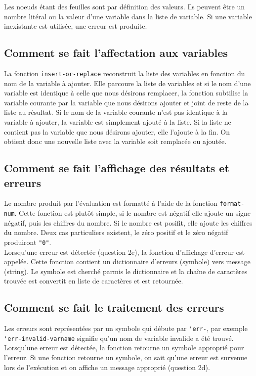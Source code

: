\documentclass[a4paper,12pt,french]{article}
\begin{document}
        Les noeuds étant des feuilles sont par définition des valeurs. Ils peuvent être un nombre litéral ou la valeur d'une variable dans la liste de variable. Si une variable inexistante est utilisée, une erreur est produite.\\
	\subsection{Comment se fait l'affectation aux variables}
        La fonction \lstinline$insert-or-replace$ reconstruit la liste des variables en fonction du nom de la variable à ajouter. Elle parcoure la liste de variables et si le nom d'une variable est identique à celle que nous désirons remplacer, la fonction subtilise la variable courante par la variable que nous désirons ajouter et joint de reste de la liste au résultat. Si le nom de la variable courante n'est pas identique à la variable à ajouter, la variable est simplement ajouté à la liste. Si la liste ne contient pas la variable que nous désirons ajouter, elle l'ajoute à la fin. On obtient donc une nouvelle liste avec la variable soit remplacée ou ajoutée.
	\subsection{Comment se fait l'affichage des résultats et erreurs}
        Le nombre produit par l'évaluation est formatté à l'aide de la fonction \lstinline$format-num$. Cette fonction est plutôt simple, si le nombre est négatif elle ajoute un signe négatif, puis les chiffres du nombre. Si le nombre est posifit, elle ajoute les chiffres du nombre. Deux cas particuliers existent, le zéro positif et le zéro négatif produiront \lstinline$"0"$.\\

        Lorsqu'une erreur est détectée (question 2e), la fonction d'affichage d'erreur est appelée. Cette fonction contient un dictionnaire d'erreurs (symbole) vers message (string). Le symbole est cherché parmis le dictionnaire et la chaîne de caractères trouvée est convertit en liste de caractères et est retournée.
	\subsection{Comment se fait le traitement des erreurs}
        Les erreurs sont représentées par un symbole qui débute par \lstinline$'err-$, par exemple \lstinline$'err-invalid-varname$ signifie qu'un nom de variable invalide a été trouvé. Lorsqu'une erreur est détectée, la fonction retourne un symbole approprié pour l'erreur. Si une fonction retourne un symbole, on sait qu'une erreur est survenue lors de l'exécution et on affiche un message approprié (question 2d).
	\newpage
\end{document}
